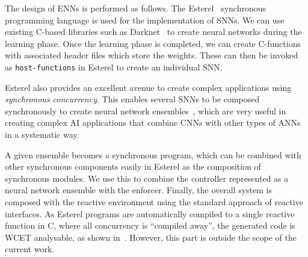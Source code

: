 The design of \acp{ENN} is performed as follows. The Esterel~\cite{Berry00}
synchronous programming language is used for the implementation of
\acp{SNN}. We can use existing C-based libraries such as
Darknet~\cite{darknet13} to create neural networks during the learning
phase. Once the learning phase is completed, we can create C-functions
with associated header files which store the weights. These can then be
invoked as \texttt{host-functions} in Esterel to create an individual \ac{SNN}. 

Esterel also provides an excellent avenue to create complex
applications using  \emph{synchronous concurrency}. This enables
several \acp{SNN} to be composed synchronously to
create neural network ensembles~\cite{Maqsood2004}, which are very useful in
creating complex AI applications that combine \acp{CNN} with other
types of \acp{ANN} in a systematic way. 

A given ensemble becomes a synchronous program, which can be combined
with other synchronous components easily in Esterel as the composition
of synchronous modules. We use this to combine the controller
represented as a neural network ensemble with the enforcer. Finally,
the overall system is composed with the reactive environment using the
standard approach of reactive interfaces. As Esterel programs are
automatically compiled to a single reactive function in C, where all
concurrency is ``compiled away'', the generated code is WCET
analysable, as shown in~\cite{sann}. However, this part is outside the
scope of the current work.
